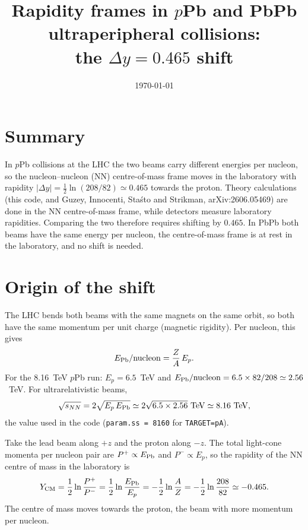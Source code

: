 \documentclass[11pt]{article}
\title{Rapidity frames in $p$Pb and PbPb ultraperipheral collisions:\\
the $\Delta y = 0.465$ shift}
\author{}
\date{\today}
\begin{document}
\maketitle

\section{Summary}

In $p$Pb collisions at the LHC the two beams carry different energies per
nucleon, so the nucleon--nucleon (NN) centre-of-mass frame moves in the
laboratory with rapidity $|\Delta y| = \tfrac12\ln(208/82)\simeq0.465$ towards
the proton. Theory calculations (this code, and Guzey, Innocenti, Sta\'sto
and Strikman, arXiv:2606.05469) are done in the NN centre-of-mass frame,
while detectors measure laboratory rapidities. Comparing the two therefore
requires shifting by $0.465$. In PbPb both beams have the same energy per
nucleon, the centre-of-mass frame is at rest in the laboratory, and no shift
is needed.

\section{Origin of the shift}

The LHC bends both beams with the same magnets on the same orbit, so both
have the same momentum per unit charge (magnetic rigidity). Per nucleon,
this gives
\begin{equation}
  E_{\rm Pb}/{\rm nucleon} = \frac{Z}{A}\,E_p .
\end{equation}
For the 8.16~TeV $p$Pb run: $E_p = 6.5$~TeV and
$E_{\rm Pb}/{\rm nucleon} = 6.5\times82/208 \simeq 2.56$~TeV. For
ultrarelativistic beams,
\begin{equation}
  \sqrt{s_{NN}} = 2\sqrt{E_p\,E_{\rm Pb}} \simeq 2\sqrt{6.5\times2.56}~{\rm TeV}
  \simeq 8.16~{\rm TeV},
\end{equation}
the value used in the code (\texttt{param.ss = 8160} for \texttt{TARGET=pA}).

Take the lead beam along $+z$ and the proton along $-z$. The total light-cone
momenta per nucleon pair are $P^+\propto E_{\rm Pb}$ and $P^-\propto E_p$, so
the rapidity of the NN centre of mass in the laboratory is
\begin{equation}
  Y_{\rm CM} = \frac12\ln\frac{P^+}{P^-} = \frac12\ln\frac{E_{\rm Pb}}{E_p}
  = -\frac12\ln\frac{A}{Z} = -\frac12\ln\frac{208}{82} \simeq -0.465 .
\end{equation}
The centre of mass moves towards the proton, the beam with more momentum per
nucleon.
\end{document}

